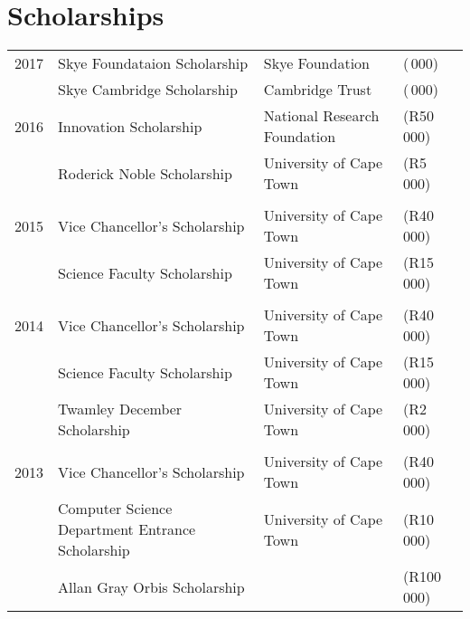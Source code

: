 
\section{Scholarships}

\begin{tabular}{R{1cm}|lll}
2017 & Skye Foundataion Scholarship & Skye Foundation&\footnotesize(\,000)\normalsize\\
     & Skye Cambridge Scholarship & Cambridge Trust &\footnotesize(\,000)\normalsize\\
2016 & Innovation Scholarship & National Research Foundation&\footnotesize(R50\,000)\normalsize\\
     &Roderick Noble Scholarship & University of Cape Town & \footnotesize(R5\,000)\normalsize\\
&&\\
2015 & Vice Chancellor's Scholarship & University of Cape Town &\footnotesize(R40\,000)\normalsize\\
& Science Faculty Scholarship & University of Cape Town &\footnotesize(R15\,000)\normalsize\\
&&\\
2014 & Vice Chancellor's Scholarship & University of Cape Town &\footnotesize(R40\,000)\normalsize\\
& Science Faculty Scholarship & University of Cape Town &\footnotesize(R15\,000)\normalsize\\
& Twamley December Scholarship & University of Cape Town &\footnotesize(R2\,000)\normalsize\\
&&\\
2013 & Vice Chancellor's Scholarship & University of Cape Town &\footnotesize(R40\,000)\normalsize\\
& Computer Science Department Entrance Scholarship & University of Cape Town &\footnotesize(R10\,000)\normalsize\\
& Allan Gray Orbis Scholarship &&\footnotesize(R100\,000)\normalsize\\
\end{tabular}

